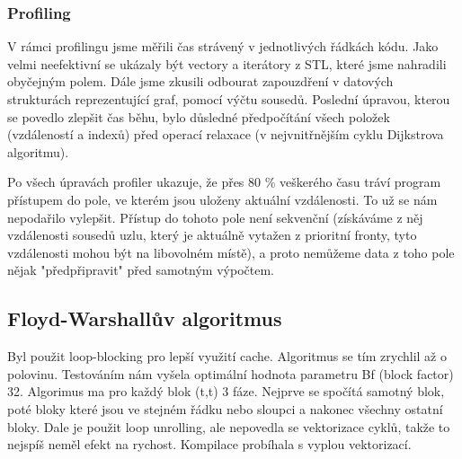 \documentclass[a4paper,11pt]{article}
\begin{document}
\subsubsection{Profiling}
V rámci profilingu jsme měřili čas strávený v jednotlivých řádkách kódu. Jako velmi neefektivní se ukázaly být vectory a iterátory z STL, které jsme nahradili obyčejným polem. Dále jsme zkusili odbourat zapouzdření v datových strukturách reprezentující graf, pomocí výčtu sousedů. Poslední úpravou, kterou se povedlo zlepšit čas běhu, bylo důsledné předpočítání všech položek (vzdáleností a indexů) před operací relaxace (v nejvnitřnějším cyklu Dijk\-strova algoritmu).
\par
Po všech úpravách profiler ukazuje, že přes 80 \% veškerého času tráví program přístupem do pole, ve kterém jsou uloženy aktuální vzdálenosti. To už se nám nepodařilo vylepšit. Přístup do tohoto pole není sekvenční (získáváme z něj vzdálenosti sousedů uzlu, který je aktuálně vytažen z prioritní fronty, tyto vzdálenosti mohou být na libovolném místě), a proto nemůžeme data z toho pole nějak "předpřipravit" před samotným výpočtem.

\subsection{Floyd-Warshallův algoritmus}
Byl použit loop-blocking pro lepší využití cache. Algoritmus se tím zrychlil až o polovinu. Testováním nám vyšela optimální hodnota parametru Bf (block factor) 32. Algorimus ma pro každý blok (t,t) 3 fáze. Nejprve se spočítá samotný blok, poté bloky které jsou ve stejném řádku nebo sloupci a nakonec všechny ostatní bloky. Dale je použit loop unrolling, ale nepovedla se vektorizace cyklů, takže to nejspíš neměl efekt na rychost. Kompilace probíhala s vyplou vektorizací. 
\end{document}
